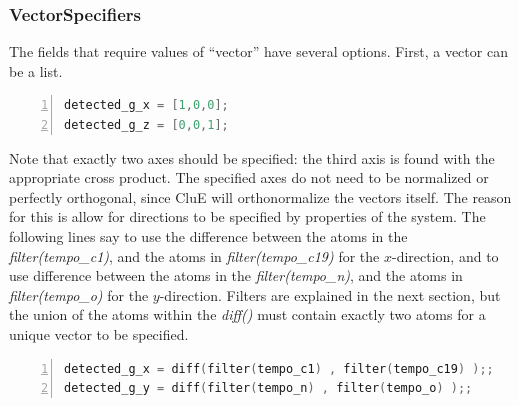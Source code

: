 \documentclass{book}
\begin{document}
\subsubsection{VectorSpecifiers} %
The fields that require values of ``vector'' have several options.
First, a vector can be a list.
\begin{lstlisting}[frame=single,numbers=left,language=c]
detected_g_x = [1,0,0];
detected_g_z = [0,0,1];
\end{lstlisting}
Note that exactly two axes should be specified: 
the third axis is found with the appropriate cross product.  
The specified axes do not need to be normalized or perfectly orthogonal, 
since CluE will orthonormalize the vectors itself.  
The reason for this is allow for directions to be specified by properties of
the system.    
The following lines say to use the difference between the atoms in the
\textit{filter(tempo\_c1)}, and the atoms in \textit{filter(tempo\_c19)} 
for the $x$-direction,
and to use difference between the atoms in the
\textit{filter(tempo\_n)}, and the atoms in \textit{filter(tempo\_o)} 
for the $y$-direction.
Filters are explained in the next section, but the union of the atoms within
the \textit{diff()} must contain exactly two atoms for a unique vector to
be specified.
\begin{lstlisting}[frame=single,numbers=left,language=c]
detected_g_x = diff(filter(tempo_c1) , filter(tempo_c19) );;
detected_g_y = diff(filter(tempo_n) , filter(tempo_o) );;
\end{lstlisting}
\end{document}
